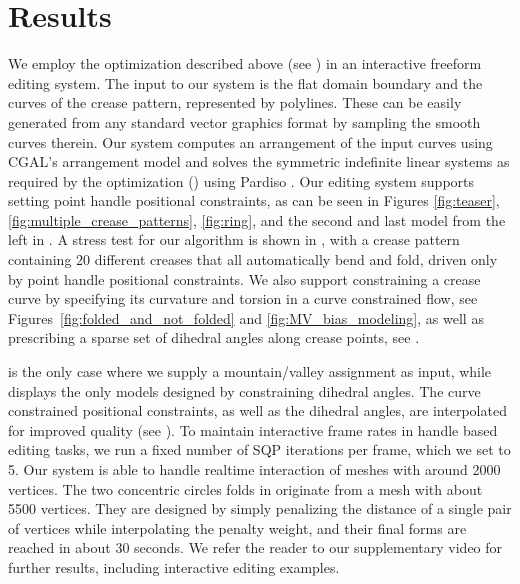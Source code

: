 \section{Results} \label{sec:results}

We employ the optimization described above (see ) in an interactive freeform editing system. The input to our system is the flat domain boundary and the curves of the crease pattern, represented by polylines. These can be easily generated from any standard vector graphics format by sampling the smooth curves therein. Our system computes an arrangement of the input curves using CGAL's arrangement model \cite{cgal,cgal_arr1,cgal_arr2} and solves the symmetric indefinite  linear systems as required by the optimization () using Pardiso \cite{PARDISO1,PARDISO2,PARDISO3}. Our editing system supports setting point handle positional constraints, as can be seen in Figures \ref{fig:teaser}, \ref{fig:multiple_crease_patterns}, \ref{fig:ring}, and the second and last model from the left in . A stress test for our algorithm is shown in , with a crease pattern containing $20$ different creases that all automatically bend and fold, driven only by point handle positional constraints. We also support  constraining a crease curve by specifying its curvature and torsion in a curve constrained flow,  see Figures~\ref{fig:folded_and_not_folded} and \ref{fig:MV_bias_modeling}, as well as prescribing a sparse set of dihedral angles along crease points, see . 

 is the only case where we supply a mountain/valley assignment as input, while  displays the only models designed by constraining dihedral angles. The curve constrained positional constraints, as well as the dihedral angles, are interpolated for improved quality (see ). To maintain interactive frame rates in handle based editing tasks, we run a fixed number of SQP iterations per frame, which we set to 5. Our system is able to handle realtime interaction of meshes with around 2000 vertices. The two concentric circles folds in  originate from a mesh with about 5500 vertices. They are designed by simply penalizing the distance of a single pair of vertices while interpolating the penalty weight, and their final forms are reached in about 30 seconds. We refer the reader to our supplementary video for further results, including interactive editing examples. 

